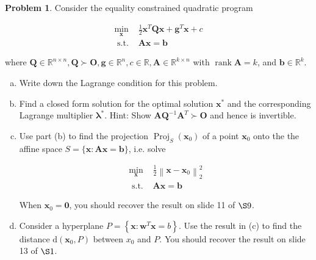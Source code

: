 \documentclass{article}
\theoremstyle{definition}
\newtheorem{prob}{Problem}
\begin{document}
	\begin{prob}
	Consider the equality constrained quadratic program
	
	$$
	\begin{array}{ll}
	\underset{\boldsymbol{x}}{\min} & \frac{1}{2} \boldsymbol{x}^{T} \boldsymbol{Q} \boldsymbol{x}+\boldsymbol{g}^{T} \boldsymbol{x}+c \\
	\text { s.t. } & \boldsymbol{A} \boldsymbol{x}=\boldsymbol{b}
	\end{array}
	$$
	
	where $\boldsymbol{Q} \in \mathbb{R}^{n \times n}, \boldsymbol{Q} \succ \boldsymbol{O}, \boldsymbol{g} \in \mathbb{R}^{n}, c \in \mathbb{R}, \boldsymbol{A} \in \mathbb{R}^{k \times n}$ with $\operatorname{rank} \boldsymbol{A}=k$, and $\boldsymbol{b} \in \mathbb{R}^{k}$.
	
	\begin{enumerate}[(a)]
	\item Write down the Lagrange condition for this problem.
	\item Find a closed form solution for the optimal solution $\boldsymbol{x}^{*}$ and the corresponding Lagrange multiplier $\boldsymbol{\lambda}^{*}$. Hint: Show $\boldsymbol{A} \boldsymbol{Q}^{-1} \boldsymbol{A}^{T} \succ \boldsymbol{O}$ and hence is invertible.
	\item Use part (b) to find the projection $\operatorname{Proj}_{S}\left(\boldsymbol{x}_{0}\right)$ of a point $\boldsymbol{x}_{0}$ onto the the affine space $S=\{\boldsymbol{x}: \boldsymbol{A} \boldsymbol{x}=\boldsymbol{b}\}$, i.e. solve
	
	$$
	\begin{array}{cl}
	\underset{\boldsymbol{x}}{\min} & \frac{1}{2}\left\|\boldsymbol{x}-\boldsymbol{x}_{0}\right\|_{2}^{2} \\
	\text { s.t. } & \boldsymbol{A} \boldsymbol{x}=\boldsymbol{b}
	\end{array}
	$$
	
	When $\boldsymbol{x}_{0}=\mathbf{0}$, you should recover the result on slide 11 of $\S 9$.
	\item Consider a hyperplane $P=\left\{\boldsymbol{x}: \boldsymbol{w}^{T} \boldsymbol{x}=b\right\}$. Use the result in (c) to find the distance $\mathrm{d}\left(\boldsymbol{x}_{0}, P\right)$ between $x_{0}$ and $P$. You should recover the result on slide 13 of $\S 1$.
	\end{enumerate}	
	\end{prob}
	
\end{document}
